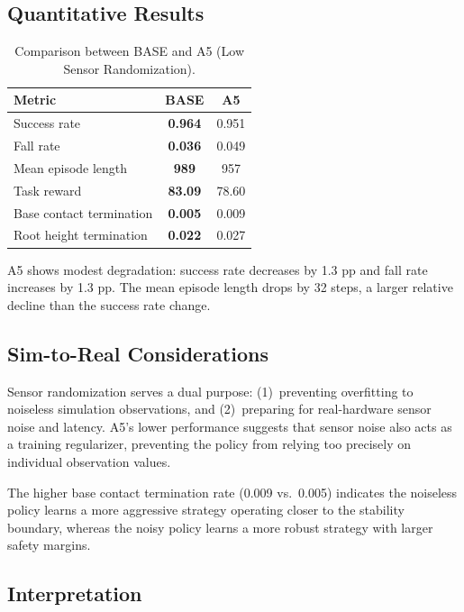 \subsection{Quantitative Results}

\begin{table}[t]
\centering
\caption{Comparison between BASE and A5 (Low Sensor Randomization).}
\label{tab:a5_results}
\begin{tabular}{lcc}
\toprule
\textbf{Metric} & \textbf{BASE} & \textbf{A5} \\
\midrule
Success rate & \textbf{0.964} & 0.951 \\
Fall rate & \textbf{0.036} & 0.049 \\
Mean episode length & \textbf{989} & 957 \\
Task reward & \textbf{83.09} & 78.60 \\
Base contact termination & \textbf{0.005} & 0.009 \\
Root height termination & \textbf{0.022} & 0.027 \\
\bottomrule
\end{tabular}
\end{table}

A5 shows modest degradation: success rate decreases by 1.3 pp and fall rate increases by 1.3 pp. The mean episode length drops by 32 steps, a larger relative decline than the success rate change.

\subsection{Sim-to-Real Considerations}

Sensor randomization serves a dual purpose: (1)~preventing overfitting to noiseless simulation observations, and (2)~preparing for real-hardware sensor noise and latency. A5's lower performance suggests that sensor noise also acts as a training regularizer, preventing the policy from relying too precisely on individual observation values.

The higher base contact termination rate (0.009 vs.\ 0.005) indicates the noiseless policy learns a more aggressive strategy operating closer to the stability boundary, whereas the noisy policy learns a more robust strategy with larger safety margins.

\subsection{Interpretation}

